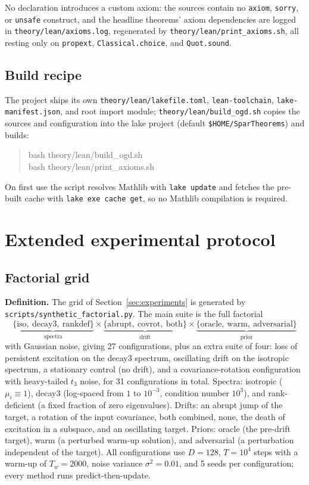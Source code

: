 No declaration introduces a custom axiom: the sources contain no \texttt{axiom}, \texttt{sorry}, or \texttt{unsafe} construct, and the headline theorems' axiom dependencies are logged in \texttt{theory/lean/axioms.log}, regenerated by \texttt{theory/lean/print\_axioms.sh}, all resting only on \texttt{propext}, \texttt{Classical.choice}, and \texttt{Quot.sound}.

\subsection{Build recipe}
The project ships its own \texttt{theory/lean/lakefile.toml}, \texttt{lean-toolchain}, \texttt{lake-manifest.json}, and root import module; \texttt{theory/lean/build\_ogd.sh} copies the sources and configuration into the lake project (default \texttt{\$HOME/SparTheorems}) and builds:
\begin{quote}
\ttfamily
bash theory/lean/build\_ogd.sh\\
bash theory/lean/print\_axioms.sh
\end{quote}
On first use the script resolves Mathlib with \texttt{lake update} and fetches the pre-built cache with \texttt{lake exe cache get}, so no Mathlib compilation is required.

\section{Extended experimental protocol}
\label{app:protocol}
\setcounter{figure}{0}\setcounter{table}{0}

\subsection{Factorial grid}
\textbf{Definition.}
The grid of Section~\ref{sec:experiments} is generated by \texttt{scripts/synthetic\_factorial.py}.
The main suite is the full factorial
\[
  \underbrace{\{\text{iso},\ \text{decay3},\ \text{rankdef}\}}_{\text{spectra}}
  \times
  \underbrace{\{\text{abrupt},\ \text{covrot},\ \text{both}\}}_{\text{drift}}
  \times
  \underbrace{\{\text{oracle},\ \text{warm},\ \text{adversarial}\}}_{\text{prior}}
\]
with Gaussian noise, giving 27 configurations, plus an extra suite of four: loss of persistent excitation on the decay3 spectrum, oscillating drift on the isotropic spectrum, a stationary control (no drift), and a covariance-rotation configuration with heavy-tailed $t_3$ noise, for 31 configurations in total.
Spectra: isotropic ($\mu_i \equiv 1$), decay3 (log-spaced from $1$ to $10^{-3}$, condition number $10^3$), and rank-deficient (a fixed fraction of zero eigenvalues).
Drifts: an abrupt jump of the target, a rotation of the input covariance, both combined, none, the death of excitation in a subspace, and an oscillating target.
Priors: oracle (the pre-drift target), warm (a perturbed warm-up solution), and adversarial (a perturbation independent of the target).
All configurations use $D = 128$, $T = 10^4$ steps with a warm-up of $T_w = 2000$, noise variance $\sigma^2 = 0.01$, and 5 seeds per configuration; every method runs predict-then-update.

